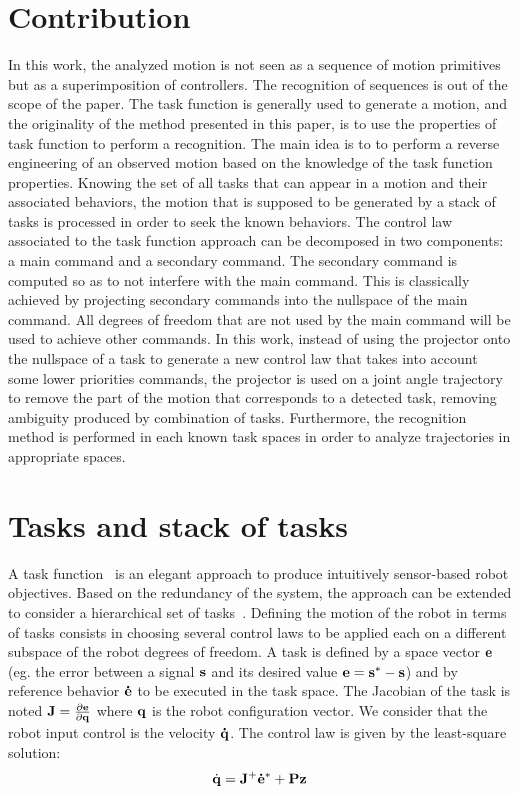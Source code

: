 \documentclass[letterpaper, 10pt, conference]{ieeeconf}      %
\begin{document}
\section{Contribution}

In this work, the analyzed motion is not seen as a sequence of motion primitives but as a
superimposition of controllers. The recognition of sequences
is out of the scope of the paper.
The task function is generally used to generate a motion, and
the originality of the method presented in this paper, is to use the properties of
task function to perform a recognition. The main idea is to
to perform a reverse engineering of an observed motion based on the knowledge
of the task function properties. Knowing the set of all tasks that can appear 
in a motion and their associated behaviors, 
the motion that is supposed to be generated by a stack of tasks is processed in order to
seek the known behaviors.
The control law associated to the task function approach can be decomposed in two components:
a main command and a secondary command.
The secondary command is computed so as to not interfere with the main command. This is classically achieved by
projecting secondary commands into the nullspace of the main command. All degrees of freedom
that are not used by the main command will be used to achieve other commands.
In this work, instead of using the projector onto the nullspace of a task to generate a new control law that takes into
account some lower priorities commands, the projector is used on a joint angle trajectory
to remove the part of the motion that corresponds to a detected task, removing
ambiguity produced by combination of tasks. Furthermore, the recognition method is
performed in each known task spaces in order to analyze trajectories in appropriate spaces.\\

\section{Tasks and stack of tasks}
A task function~\cite{samson91} is an elegant approach to produce intuitively
sensor-based robot objectives. Based on the redundancy of the system, the
approach can be extended to consider a hierarchical set of
tasks~\cite{siciliano91}.  Defining the motion of the robot in terms of tasks
consists in choosing several control laws to be applied each on a different
subspace of the robot degrees of freedom. A task is defined by a space vector
${\mathbf{e}}$ (eg. the error between a signal ${\mathbf{s}}$ and its desired value
${\mathbf{e}}={\mathbf{s}}^* - {\mathbf{s}}$) and by reference behavior ${\mathbf{\dot{e}}}$ to be
executed in the task space. The Jacobian of the task is noted
${\mathbf{J}}=\frac{\partial{{\mathbf{e}}}}{\partial{{\mathbf{q}}}}$ where ${\mathbf{q}}$ is the robot
configuration vector.  We consider that the robot input control is the velocity
${\mathbf{\dot{q}}}$.  The control law is given by the least-square solution:
\begin{equation}
\dot{{\mathbf{q}}} = {\mathbf{J}}^+ {\mathbf{\dot{e}}}^* + {\mathbf{P}}{\mathbf{z}}
\end{equation}
\end{document}
